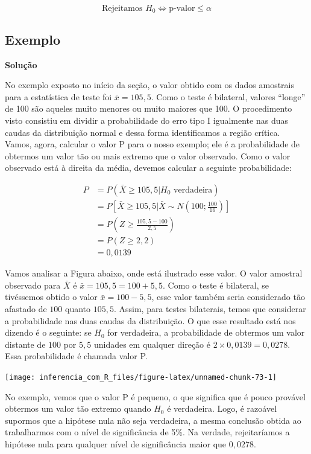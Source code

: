 \documentclass[
]{book}
\begin{document}
\[\text{Rejeitamos } H_0\Leftrightarrow \text{p-valor} \leq \alpha\]

\hypertarget{exemplo-3}{%
\subsection{Exemplo}\label{exemplo-3}}

\textbf{Solução}

No exemplo exposto no início da seção, o valor obtido com os dados amostrais para a estatística de teste foi \(\bar x = 105,5\). Como o teste é bilateral, valores ``longe'' de 100 são aqueles muito menores ou muito maiores que 100. O procedimento visto consistiu em dividir a probabilidade do erro tipo I igualmente nas duas caudas da distribuição normal e dessa forma identificamos a região crítica. Vamos, agora, calcular o valor P para o nosso exemplo; ele é a probabilidade de obtermos um valor tão ou mais extremo que o valor observado. Como o valor observado está à direita da média, devemos calcular a seguinte probabilidade:

\[
\begin{aligned}
P &= P\left(\bar X \geq 105,5|H_0\text{ verdadeira}\right)\\
&= P\left[\bar X \geq 105,5|\bar X \sim N\left(100;\frac{100}{16}\right)\right]\\
&=P\left(Z\geq \frac{105,5-100}{2,5}\right)\\
&=P(Z\geq 2,2)\\
&=0,0139
\end{aligned}
\]

Vamos analisar a Figura abaixo, onde está ilustrado esse valor. O valor amostral observado para \(\bar X\) é \(\bar x = 105,5 = 100+5,5\). Como o teste é bilateral, se tivéssemos obtido o valor \(\bar x = 100 - 5,5\), esse valor também seria considerado tão afastado de \(100\) quanto \(105,5\). Assim, para testes bilaterais, temos que considerar a probabilidade nas duas caudas da distribuição. O que esse resultado está nos dizendo é o seguinte: se \(H_0\) for verdadeira, a probabilidade de obtermos um valor distante de \(100\) por \(5,5\) unidades em qualquer direção é \(2\times 0,0139 = 0,0278\). Essa probabilidade é chamada valor P.

\begin{center}\texttt{[image: inferencia\_com\_R\_files/figure-latex/unnamed-chunk-73-1]} \end{center}

No exemplo, vemos que o valor P é pequeno, o que significa que é pouco provável obtermos um valor tão extremo quando \(H_0\) é verdadeira. Logo, é razoável supormos que a hipótese nula não seja verdadeira, a mesma conclusão obtida ao trabalharmos com o nível de significância de 5\%. Na verdade, rejeitaríamos a hipótese nula para qualquer nível de significância maior que \(0,0278\).
\end{document}
